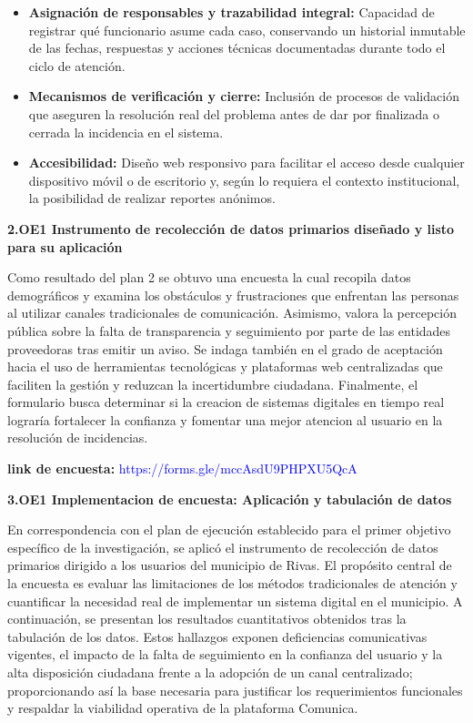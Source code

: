 {\begin{itemize}
	\item \textbf{Asignación de responsables y trazabilidad integral:} Capacidad de registrar qué funcionario asume cada caso, conservando un historial inmutable de las fechas, respuestas y acciones técnicas documentadas durante todo el ciclo de atención.
	
	\item \textbf{Mecanismos de verificación y cierre:} Inclusión de procesos de validación que aseguren la resolución real del problema antes de dar por finalizada o cerrada la incidencia en el sistema.
	
	\item \textbf{Accesibilidad:} Diseño web responsivo para facilitar el acceso desde cualquier dispositivo móvil o de escritorio y, según lo requiera el contexto institucional, la posibilidad de realizar reportes anónimos.
\end{itemize}


\textbf{2.\hypertarget{subsec:instrumento}{OE1} Instrumento de recolección de datos primarios diseñado y listo para su aplicación} 

Como resultado del plan 2 se obtuvo una encuesta la cual recopila datos demográficos y examina los obstáculos y frustraciones que enfrentan las personas al utilizar canales tradicionales de comunicación. Asimismo, valora la percepción pública sobre la falta de transparencia y seguimiento por parte de las entidades proveedoras tras emitir un aviso. Se indaga también en el grado de aceptación hacia el uso de herramientas tecnológicas y plataformas web centralizadas que faciliten la gestión y reduzcan la incertidumbre ciudadana. Finalmente, el formulario busca determinar si la creacion de sistemas digitales en tiempo real lograría fortalecer la confianza y fomentar una mejor atencion al usuario en la resolución de incidencias.

\textbf{link de encuesta:}
\textcolor{blue}{https://forms.gle/mccAsdU9PHPXU5QcA}

\textbf{3.\hypertarget{subsec:instrumento2}{OE1} Implementacion de encuesta: Aplicación y tabulación de datos}

En correspondencia con el plan de ejecución establecido para el primer objetivo específico de la investigación, se aplicó el instrumento de recolección de datos primarios dirigido a los usuarios del municipio de Rivas. El propósito central de la encuesta es evaluar las limitaciones de los métodos tradicionales de atención y cuantificar la necesidad real de implementar un sistema digital en el municipio. A continuación, se presentan los resultados cuantitativos obtenidos tras la tabulación de los datos. Estos hallazgos exponen deficiencias comunicativas vigentes, el impacto de la falta de seguimiento en la confianza del usuario y la alta disposición ciudadana frente a la adopción de un canal centralizado; proporcionando así la base necesaria para justificar los requerimientos funcionales y respaldar la viabilidad operativa de la plataforma Comunica.
 
}
